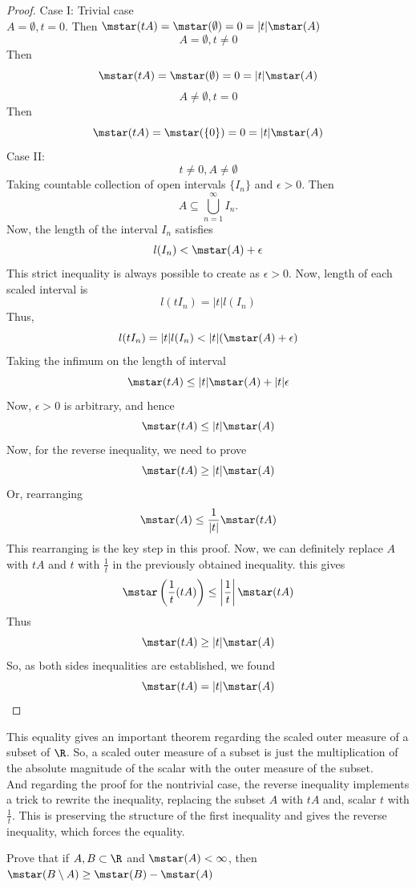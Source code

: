    \begin{proof}
        Case I: Trivial case\\
        $A = \emptyset, t=0$. Then $\mstar(tA)=\mstar(\emptyset)=0=|t|\mstar(A)$\\
        \[
        A=\emptyset, t\neq 0
        \]
        Then 
        \[
        \mstar(tA)=\mstar(\emptyset)=0=|t|\mstar(A)
        \]
        \[
        A\neq \emptyset, t=0
        \]
        Then
        \[
        \mstar(tA)=\mstar(\{0\})=0=|t|\mstar(A)
        \]
        Case II:
        \[
        t\neq 0, A\neq \emptyset
        \]
        Taking countable collection of open intervals $\{I_n\}$ and $\epsilon >0$. Then
        \[
        A \subseteq \bigcup_{n=1}^\infty I_n.
        \]
        Now, the length of the interval $I_n$ satisfies
        \[
        l(I_n) < \mstar(A) + \epsilon
        \]
        This strict inequality is always possible to create as $\epsilon>0$. Now, length of each scaled interval is
        \[
        l(tI_n) = |t| l(I_n)
        \]
        Thus,
        \[
        l(tI_n) = |t|l(I_n) < |t|(\mstar(A) +\epsilon)
        \]
        Taking the infimum on the length of interval
        \[
        \mstar(tA) \leq |t| \mstar(A) +|t| \epsilon
        \]
        Now, $\epsilon>0$ is arbitrary, and hence
        \[
        \mstar(tA) \leq |t| \mstar(A)
        \]
        Now, for the reverse inequality, we need to prove
        \[
        \mstar(tA) \geq |t|\mstar(A)
        \]
        Or, rearranging
        \[
        \mstar(A)\leq \frac{1}{|t|}\mstar(tA)
        \]
        This rearranging is the key step in this proof. Now, we can definitely replace $A$ with $tA$ and $t$ with $\frac{1}{t}$ in the previously obtained inequality. this gives
        \[
        \mstar\left(\frac{1}{t}(tA)\right) \leq \left|\frac{1}{t}\right|\mstar(tA)
        \]
        Thus
        \[
         \mstar(tA)\geq |t|\mstar(A)
        \]
So, as both sides inequalities are established, we found
        \[
        \mstar(tA) = |t|\mstar(A)
        \]

    \end{proof}
    \begin{takeaway}
        This equality gives an important theorem regarding the scaled outer measure of a subset of $\R$. So, a scaled outer measure of a subset is just the multiplication of the absolute magnitude of the scalar with the outer measure of the subset. \\
        And regarding the proof for the nontrivial case, the reverse inequality implements a trick to rewrite the inequality, replacing the subset $A$ with $tA$ and, scalar $t$ with $\frac{1}{t}$. This is preserving the structure of the first inequality and gives the reverse inequality, which forces the equality. 
    \end{takeaway}
    \begin{exercise}
        Prove that if $A, B \subset \R$ and $\mstar(A) < \infty$, then $\mstar(B\setminus A) \geq \mstar(B) - \mstar(A)$
    \end{exercise}

